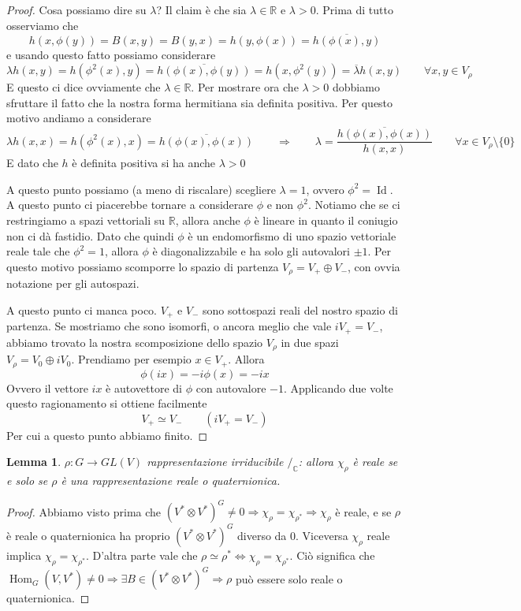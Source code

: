 \documentclass[11pt]{article}
\theoremstyle{plain}
\newtheorem{lemma}[thm]{Lemma}
\theoremstyle{definition}
\theoremstyle{remark}
\newcommand{\C}{\mathbb{C}}
\newcommand{\R}{\mathbb{R}}
\DeclareMathOperator{\Hom}{Hom}
\DeclareMathOperator{\Id}{Id}
\DeclareMathOperator{\iso}{\simeq}
\begin{document}
\begin{proof}
Cosa possiamo dire su $\lambda$? Il claim è che sia $\lambda \in \R$ e $\lambda > 0$. Prima di tutto osserviamo che
\[h(x, \phi(y)) = B(x, y) = B(y, x) = h(y, \phi(x)) = \overline{h(\phi(x), y)} \]
e usando questo fatto possiamo considerare
\[ \lambda h(x, y) = h(\phi^2(x), y) = \overline{h(\phi(x), \phi(y))} = h(x, \phi^2(y)) = \overline{\lambda} h(x, y) \qquad \forall x, y \in V_\rho\]
E questo ci dice ovviamente che $\lambda \in \R$. Per mostrare ora che $\lambda > 0$ dobbiamo sfruttare il fatto che la nostra forma hermitiana sia definita positiva. Per questo motivo andiamo a considerare
\[\lambda h(x, x) = h (\phi^2(x), x) = \overline{h(\phi(x), \phi(x))} \qquad\Longrightarrow\qquad \lambda = \dfrac{\overline{h(\phi(x), \phi(x))}}{ h(x,x)} \qquad \forall x \in V_\rho\setminus\{0\}\]
E dato che $h $ è definita positiva si ha anche $\lambda > 0$

A questo punto possiamo (a meno di riscalare) scegliere $\lambda = 1$, ovvero $\phi^2 = \Id$. A questo punto ci piacerebbe tornare a considerare $\phi$ e non $\phi^2$. Notiamo che se ci restringiamo a spazi vettoriali su $\R$, allora anche $\phi$ è lineare in quanto il coniugio non ci dà fastidio. Dato che quindi $\phi$ è un endomorfismo di uno spazio vettoriale reale tale che $\phi^2=1$, allora $\phi$ è diagonalizzabile e ha solo gli autovalori $\pm 1$.  Per questo motivo possiamo scomporre lo spazio di partenza $V_\rho = V_+ \oplus V_-$, con ovvia notazione per gli autospazi.

A questo punto ci manca poco. $V_+$ e $V_-$ sono sottospazi reali del nostro spazio di partenza. Se mostriamo che sono isomorfi, o ancora meglio che vale $i V_+ = V_-$, abbiamo trovato la nostra scomposizione dello spazio $V_\rho$ in due spazi $V_\rho = V_0 \oplus iV_0$.
Prendiamo per esempio $x \in V_+$. Allora
\[ \phi(ix) = - i \phi(x) = -i x \]
Ovvero il vettore $ix$ è autovettore di $\phi$ con autovalore $-1$. Applicando due volte questo ragionamento si ottiene facilmente
\[ V_+ \iso V_- \qquad (i V_+ = V_-)\]
Per cui a questo punto abbiamo finito.
\end{proof}


\begin{lemma} $\rho:G\rightarrow GL(V)$ rappresentazione irriducibile $/_\C$: allora $\chi_\rho$ è reale se e solo se $\rho$ è una rappresentazione reale o quaternionica.
\end{lemma}
\begin{proof} Abbiamo visto prima che $(V^*\otimes V^*)^G\neq 0\Rightarrow \chi_\rho=\chi_{\rho^*}\Rightarrow \chi_\rho$ è reale, e se $\rho$ è reale o quaternionica ha proprio $(V^*\otimes V^*)^G$ diverso da $0$. Viceversa $\chi_\rho$ reale implica $\chi_\rho=\chi_{\rho^*}$. D'altra parte vale che $\rho\iso\rho^*\Leftrightarrow \chi_\rho =\chi_{\rho^*}$. Ciò significa che $\Hom_G(V,V^*)\neq 0\Rightarrow \exists B\in (V^*\otimes V^*)^G\Rightarrow \rho$ può essere solo reale o quaternionica.
\end{proof}
\end{document}

